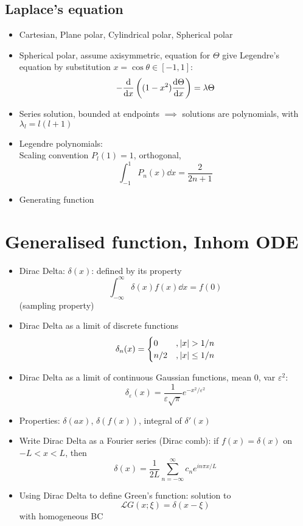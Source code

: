\subsection*{Laplace's equation}
\begin{itemize}
    \item Cartesian, Plane polar, Cylindrical polar, Spherical polar

    \item Spherical polar, assume axisymmetric, equation for $\Theta$ give Legendre's equation by substitution $x= \cos\theta \in [-1,1]$:
          \[-\frac{\mathrm{d}}{\mathrm{d}{x}} \left((1-x^2) \frac{\mathrm{d}{\Theta}}{\mathrm{d}{x}} \right) = \lambda \Theta\]

    \item Series solution, bounded at endpoints $\implies$ solutions are polynomials, with $\lambda_l = l(l+1)$

    \item Legendre polynomials: \\
          Scaling convention $P_l(1)=1$, orthogonal, \[\int_{-1}^1 P_n(x) \dd{x} = \frac{2}{2n+1}\]

    \item Generating function

\end{itemize}

\section{Generalised function, Inhom ODE}

\begin{itemize}
    \item Dirac Delta: $\delta(x)$: defined by its property \[\int_{-\infty}^{\infty} \delta(x) f(x) \dd{x} = f(0)\] (sampling property)
    \item Dirac Delta as a limit of discrete functions
          \[ \delta_n(x) = \begin{cases}
                  0   & , \left| x \right| > 1/n    \\
                  n/2 & , \left| x \right| \leq 1/n
              \end{cases} \]

    \item Dirac Delta as a limit of continuous Gaussian functions, mean 0, var $\varepsilon^2$:
          \[\delta_\varepsilon(x) = \frac{1}{\varepsilon \sqrt{\pi}} e^{-x^2/\varepsilon^2}\]


    \item Properties:  $\delta(ax)$,  $\delta(f(x))$, integral of $\delta'(x)$
    \item Write Dirac Delta as a Fourier series (Dirac comb): if $f(x) = \delta(x)$ on $-L<x<L$, then \[\delta(x) = \frac{1}{2L} \sum_{n=-\infty}^{\infty} c_n e^{in\pi x/L}\]
    \item Using Dirac Delta to define Green's function: solution to \[\mathcal{L}G(x;\xi) = \delta(x-\xi)\] with homogeneous BC
\end{itemize}



